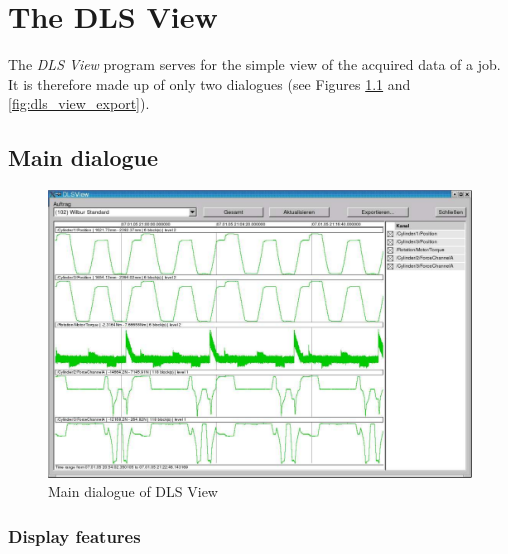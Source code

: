 \documentclass[a4paper,12pt,BCOR6mm,bibtotoc,idxtotoc]{scrbook}
\begin{document}

\chapter{The DLS View} \label{sec:view} 

The \textit{DLS View} program serves for the simple view of the acquired data of a job. It is therefore made up of only two dialogues (see Figures \ref{fig:dls_view_main} and \ref{fig:dls_view_export}).


\section{Main dialogue} \label{sec:view_main}

\begin{figure}[tbh] \begin{center} \includegraphics[width=\textwidth]{bilder/view_normal} \end{center} \caption{Main dialogue of DLS View} \label{fig:dls_view_main} \end{figure}


\subsection{Display features}
\end{document}
